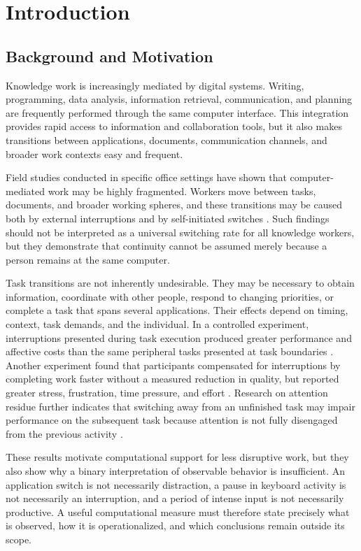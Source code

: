 \chapter{Introduction}
\label{chap:introduction}

\section{Background and Motivation}

Knowledge work is increasingly mediated by digital systems. Writing, programming, data analysis, information retrieval, communication, and planning are frequently performed through the same computer interface. This integration provides rapid access to information and collaboration tools, but it also makes transitions between applications, documents, communication channels, and broader work contexts easy and frequent.

Field studies conducted in specific office settings have shown that computer-mediated work may be highly fragmented. Workers move between tasks, documents, and broader working spheres, and these transitions may be caused both by external interruptions and by self-initiated switches \parencite{gonzalez2004workingSpheres,czerwinski2004diary}. Such findings should not be interpreted as a universal switching rate for all knowledge workers, but they demonstrate that continuity cannot be assumed merely because a person remains at the same computer.

Task transitions are not inherently undesirable. They may be necessary to obtain information, coordinate with other people, respond to changing priorities, or complete a task that spans several applications. Their effects depend on timing, context, task demands, and the individual. In a controlled experiment, interruptions presented during task execution produced greater performance and affective costs than the same peripheral tasks presented at task boundaries \parencite{bailey2006attention}. Another experiment found that participants compensated for interruptions by completing work faster without a measured reduction in quality, but reported greater stress, frustration, time pressure, and effort \parencite{mark2008cost}. Research on attention residue further indicates that switching away from an unfinished task may impair performance on the subsequent task because attention is not fully disengaged from the previous activity \parencite{leroy2009attentionResidue}. 

These results motivate computational support for less disruptive work, but they also show why a binary interpretation of observable behavior is insufficient. An application switch is not necessarily distraction, a pause in keyboard activity is not necessarily an interruption, and a period of intense input is not necessarily productive. A useful computational measure must therefore state precisely what is observed, how it is operationalized, and which conclusions remain outside its scope. 


